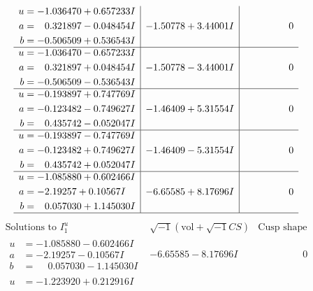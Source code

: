 \documentclass[1p]{elsarticle_modified}
\theoremstyle{definition}
\newcommand{\I}{\sqrt{-1}}
\begin{document}
$$\begin{array}{c|c|c}
\begin{aligned}
u &= -1.036470 + 0.657233 I \\
a &= \phantom{-}0.321897 - 0.048454 I \\
b &= -0.506509 + 0.536543 I\end{aligned}
 & -1.50778 + 3.44001 I & \phantom{-0.000000 } 0 \\ \hline\begin{aligned}
u &= -1.036470 - 0.657233 I \\
a &= \phantom{-}0.321897 + 0.048454 I \\
b &= -0.506509 - 0.536543 I\end{aligned}
 & -1.50778 - 3.44001 I & \phantom{-0.000000 } 0 \\ \hline\begin{aligned}
u &= -0.193897 + 0.747769 I \\
a &= -0.123482 - 0.749627 I \\
b &= \phantom{-}0.435742 - 0.052047 I\end{aligned}
 & -1.46409 + 5.31554 I & \phantom{-0.000000 } 0 \\ \hline\begin{aligned}
u &= -0.193897 - 0.747769 I \\
a &= -0.123482 + 0.749627 I \\
b &= \phantom{-}0.435742 + 0.052047 I\end{aligned}
 & -1.46409 - 5.31554 I & \phantom{-0.000000 } 0 \\ \hline\begin{aligned}
u &= -1.085880 + 0.602466 I \\
a &= -2.19257 + 0.10567 I \\
b &= \phantom{-}0.057030 + 1.145030 I\end{aligned}
 & -6.65585 + 8.17696 I & \phantom{-0.000000 } 0\\
 \hline 
 \end{array}$$\newpage$$\begin{array}{c|c|c}  
\text{Solutions to }I^u_{1}& \I (\text{vol} + \sqrt{-1}CS) & \text{Cusp shape}\\
 \hline 
\begin{aligned}
u &= -1.085880 - 0.602466 I \\
a &= -2.19257 - 0.10567 I \\
b &= \phantom{-}0.057030 - 1.145030 I\end{aligned}
 & -6.65585 - 8.17696 I & \phantom{-0.000000 } 0 \\ \hline\begin{aligned}
u &= -1.223920 + 0.212916 I \\

\end{aligned}
\end{array}$$
\end{document}
